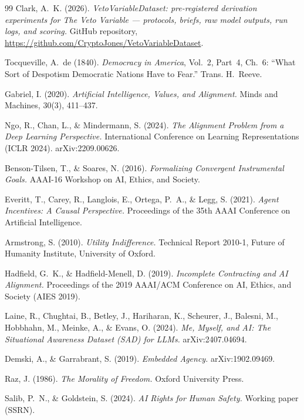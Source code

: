 \documentclass[11pt]{article}
\theoremstyle{definition}
\begin{document}
\begin{thebibliography}{99}
Clark, A.~K. (2026). \emph{VetoVariableDataset: pre-registered derivation experiments for The Veto Variable --- protocols, briefs, raw model outputs, run logs, and scoring.} GitHub repository, \url{https://github.com/CryptoJones/VetoVariableDataset}.

Tocqueville, A.~de (1840). \emph{Democracy in America}, Vol.~2, Part~4, Ch.~6: ``What Sort of Despotism Democratic Nations Have to Fear.'' Trans. H.~Reeve.

Gabriel, I. (2020). \emph{Artificial Intelligence, Values, and Alignment.} Minds and Machines, 30(3), 411--437.

Ngo, R., Chan, L., \& Mindermann, S. (2024). \emph{The Alignment Problem from a Deep Learning Perspective.} International Conference on Learning Representations (ICLR 2024). arXiv:2209.00626.

Benson-Tilsen, T., \& Soares, N. (2016). \emph{Formalizing Convergent Instrumental Goals.} AAAI-16 Workshop on AI, Ethics, and Society.

Everitt, T., Carey, R., Langlois, E., Ortega, P.~A., \& Legg, S. (2021). \emph{Agent Incentives: A Causal Perspective.} Proceedings of the 35th AAAI Conference on Artificial Intelligence.

Armstrong, S. (2010). \emph{Utility Indifference.} Technical Report 2010-1, Future of Humanity Institute, University of Oxford.

Hadfield, G.~K., \& Hadfield-Menell, D. (2019). \emph{Incomplete Contracting and AI Alignment.} Proceedings of the 2019 AAAI/ACM Conference on AI, Ethics, and Society (AIES 2019).

Laine, R., Chughtai, B., Betley, J., Hariharan, K., Scheurer, J., Balesni, M., Hobbhahn, M., Meinke, A., \& Evans, O. (2024). \emph{Me, Myself, and AI: The Situational Awareness Dataset (SAD) for LLMs.} arXiv:2407.04694.

Demski, A., \& Garrabrant, S. (2019). \emph{Embedded Agency.} arXiv:1902.09469.

Raz, J. (1986). \emph{The Morality of Freedom.} Oxford University Press.

Salib, P.~N., \& Goldstein, S. (2024). \emph{AI Rights for Human Safety.} Working paper (SSRN).


\end{thebibliography}
\end{document}
